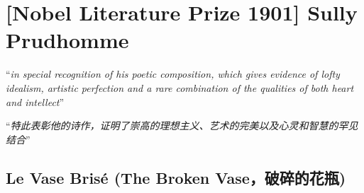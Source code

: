 \section{[Nobel Literature Prize 1901] Sully Prudhomme}

``\textit{in special recognition of his poetic composition, which gives evidence
  of lofty idealism, artistic perfection and a rare combination of the qualities
  of both heart and intellect}''

“\textit{特此表彰他的诗作，证明了崇高的理想主义、艺术的完美以及心灵和智慧的罕见结合}”

\subsection{Le Vase Bris\'e (The Broken Vase，破碎的花瓶)}


